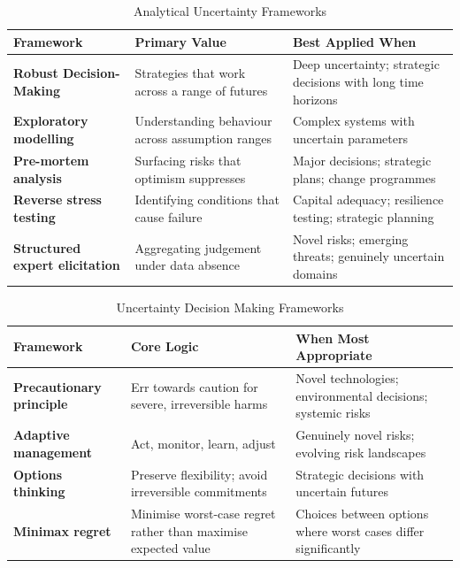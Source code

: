 \begin{table}[H]
  \centering
  \renewcommand{\arraystretch}{1.5}
  \begin{tabularx}{\textwidth}{ | >{\raggedright\arraybackslash}p{} 
								| >{\raggedright\arraybackslash}p{} 
                                | >{\raggedright\arraybackslash}X | }
    \hline
    \textbf{Framework} & \textbf{Primary Value} & \textbf{Best Applied When} \\
    \hline
    \textbf{Robust Decision-Making} & Strategies that work across a range of futures & Deep uncertainty; strategic decisions with long time horizons\\
    \hline
    \textbf{Exploratory modelling} & Understanding behaviour across assumption ranges & Complex systems with uncertain parameters\\
    \hline
    \textbf{Pre-mortem analysis} & Surfacing risks that optimism suppresses & Major decisions; strategic plans; change programmes\\
    \hline
    \textbf{Reverse stress testing} & Identifying conditions that cause failure & Capital adequacy; resilience testing; strategic planning\\
    \hline
    \textbf{Structured expert elicitation} & Aggregating judgement under data absence & Novel risks; emerging threats; genuinely uncertain domains\\
    \hline
  \end{tabularx}
  \caption{Analytical Uncertainty Frameworks}
\end{table}

\begin{table}[H]
  \centering
  \renewcommand{\arraystretch}{1.5}
  \begin{tabularx}{\textwidth}{ | >{\raggedright\arraybackslash}p{} 
								| >{\raggedright\arraybackslash}p{} 
                                | >{\raggedright\arraybackslash}X | }
    \hline
    \textbf{Framework} & \textbf{Core Logic} & \textbf{When Most Appropriate} \\
    \hline
    \textbf{Precautionary principle} & Err towards caution for severe, irreversible harms & Novel technologies; environmental decisions; systemic risks\\
    \hline
    \textbf{Adaptive management} & Act, monitor, learn, adjust & Genuinely novel risks; evolving risk landscapes\\
    \hline
    \textbf{Options thinking} & Preserve flexibility; avoid irreversible commitments & Strategic decisions with uncertain futures\\
    \hline
    \textbf{Minimax regret} & Minimise worst-case regret rather than maximise expected value & Choices between options where worst cases differ significantly\\
    \hline
  \end{tabularx}
  \caption{Uncertainty Decision Making Frameworks}
\end{table}

